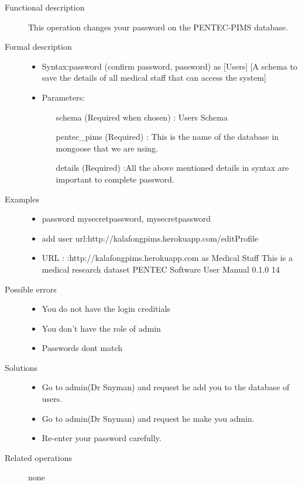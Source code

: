 \documentclass[14pt, a4paper]{article}
\begin{document}
\begin{description}
\item[Functional description] This operation changes your password on the PENTEC-PIMS database.
\item[Formal description]\hfill
\begin{itemize}
	\item Syntax:password (confirm password, password) as [Users] [A schema to save the details of all medical staff that can access the system]\\
	\item Parameters:
	\begin{itemize}
		\item [schema] (Required when chosen) : Users Schema
		\item [pentec\_pims] (Required) : This is the name of the database in mongoose that we are using.
		\item [details] (Required) :All the above mentioned details in syntax are important to complete password.
	\end{itemize}
\end{itemize}

\item[Examples]\hfill
\begin{itemize}
	\item password mysecretpassword, mysecretpassword
	\item add user url:http://kalafongpims.herokuapp.com/editProfile
	\item URL : :http://kalafongpims.herokuapp.com as Medical Staff This is a medical research dataset
	PENTEC Software User Manual 0.1.0 14
\end{itemize}
\item[Possible errors]\hfill
\begin{itemize}
	\item You do not have the login creditials
	\item You don't have the role of admin
	\item Passwords dont match
\end{itemize}
\item[Solutions]\hfill
\begin{itemize}
	\item Go to admin(Dr Snyman) and request he add you to the database of users.
	\item  Go to admin(Dr Snyman) and request he make you admin.
	\item Re-enter your password carefully.
\end{itemize}
\item[Related operations] none
\end{description}
\end{document}
